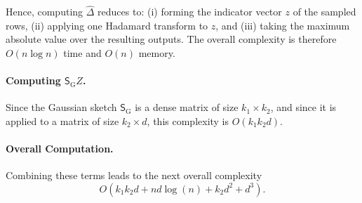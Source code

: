 \documentclass[11pt]{article}
\theoremstyle{definition}
\theoremstyle{plain}
\begin{document}
    Hence, computing $\widehat{\Delta}$ reduces to:
    (i) forming the indicator vector $z$ of the sampled rows,
    (ii) applying one Hadamard transform to $z$, and
    (iii) taking the maximum absolute value over the resulting outputs.
    The overall complexity is therefore $O(n\log n)$ time and $O(n)$ memory.
    
    \paragraph{Computing $\mathsf{S}_{\mathrm{G}}Z$.} 
    Since the Gaussian sketch $\mathsf{S}_{\mathrm{G}}$ is a dense matrix of size $k_1 \times k_2$, and since it is applied to a matrix of size $k_2 \times d$, this complexity is $O(k_1k_2d)$. 

    \paragraph{Overall Computation.} 
    Combining these terms leads to the next overall complexity 
    \begin{equation}
        O\left(k_1k_2d + nd\log(n) + k_2 d^2 + d^3\right).
    \end{equation}
\end{document}
